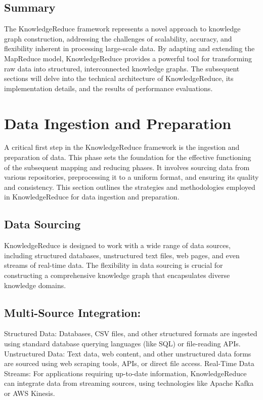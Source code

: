 \documentclass{article}
\begin{document}
\subsection{Summary}
The KnowledgeReduce framework represents a novel approach to knowledge graph construction, addressing the challenges of scalability, accuracy, and flexibility inherent in processing large-scale data. By adapting and extending the MapReduce model, KnowledgeReduce provides a powerful tool for transforming raw data into structured, interconnected knowledge graphs. The subsequent sections will delve into the technical architecture of KnowledgeReduce, its implementation details, and the results of performance evaluations.

\section{Data Ingestion and Preparation}
A critical first step in the KnowledgeReduce framework is the ingestion and preparation of data. This phase sets the foundation for the effective functioning of the subsequent mapping and reducing phases. It involves sourcing data from various repositories, preprocessing it to a uniform format, and ensuring its quality and consistency. This section outlines the strategies and methodologies employed in KnowledgeReduce for data ingestion and preparation.

\subsection{Data Sourcing}
KnowledgeReduce is designed to work with a wide range of data sources, including structured databases, unstructured text files, web pages, and even streams of real-time data. The flexibility in data sourcing is crucial for constructing a comprehensive knowledge graph that encapsulates diverse knowledge domains.

\subsection{Multi-Source Integration:}
Structured Data: Databases, CSV files, and other structured formats are ingested using standard database querying languages (like SQL) or file-reading APIs.
Unstructured Data: Text data, web content, and other unstructured data forms are sourced using web scraping tools, APIs, or direct file access.
Real-Time Data Streams: For applications requiring up-to-date information, KnowledgeReduce can integrate data from streaming sources, using technologies like Apache Kafka or AWS Kinesis.
\end{document}
